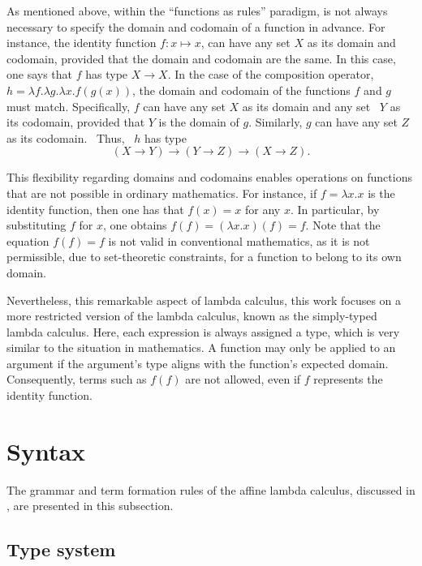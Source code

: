As mentioned above,  within  the “functions as rules” paradigm, is not
always necessary to specify the domain and codomain of a function in advance. For instance, the identity function $f: x \mapsto x$, can have any set $X$ as its domain and codomain, provided that the domain and codomain are the same. In this case, one says that $f$ has type $X \rightarrow{} X$. In the case of the composition operator, $h=\lambda f. \lambda g. \lambda x. f(g(x))$, the domain and codomain of the functions $f$ and $g$ must match. Specifically, $f$ can have any set $X$ as its domain and any set  $Y$ as its codomain, provided that $Y$ is the domain of $g$. Similarly, $g$ can have any set $Z$ as its codomain.  Thus,  $h$ has type $$(X \rightarrow{} Y) \rightarrow{} (Y \rightarrow{} Z) \rightarrow{} (X \rightarrow{} Z).$$ 

This flexibility regarding domains and codomains enables operations on functions that are not possible in ordinary mathematics. For instance, if $f = \lambda x.x$ is the identity function, then one has that $f(x) = x$ for any $x$. In particular, by substituting $f$ for $x$, one obtains $f(f) = (\lambda x.x)(f) = f$. Note that the equation $f(f) = f$ is not valid in conventional mathematics, as it is not permissible, due to set-theoretic constraints, for a function to belong to its own domain.

Nevertheless, this remarkable aspect of lambda calculus, this work focuses on a more restricted version of the lambda calculus, known as the simply-typed lambda calculus. Here, each expression is always assigned a type, which is very similar to the situation in mathematics. A function may only be applied to an argument if the argument's type aligns with the function's expected domain. Consequently, terms such as $f(f)$ are not allowed, even if $f$ represents the identity function.






\section{Syntax}

The grammar and term formation rules of the affine lambda calculus, discussed in \cite{dahlqvist2022syntactic}, are presented in this subsection.

\subsection{Type system}

